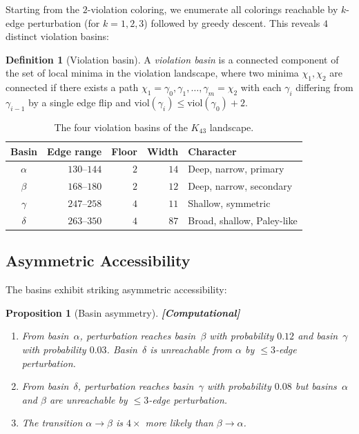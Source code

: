 \documentclass[12pt,a4paper]{article}
\newcommand{\computational}[1]{\textcolor{computational}{\textbf{[Computational]}} #1}
\newtheorem{proposition}[theorem]{Proposition}
\theoremstyle{definition}
\newtheorem{definition}[theorem]{Definition}
\theoremstyle{remark}
\newcommand{\Kn}[1]{K_{#1}}
\newcommand{\viol}{\mathrm{viol}}
\begin{document}
Starting from the $2$-violation coloring, we enumerate all colorings reachable by $k$-edge perturbation (for $k = 1, 2, 3$) followed by greedy descent.  This reveals $4$ distinct violation basins:

\begin{definition}[Violation basin]\label{def:violbasin}
A \emph{violation basin} is a connected component of the set of local minima in the violation landscape, where two minima $\chi_1, \chi_2$ are connected if there exists a path $\chi_1 = \gamma_0, \gamma_1, \ldots, \gamma_m = \chi_2$ with each $\gamma_i$ differing from $\gamma_{i-1}$ by a single edge flip and $\viol(\gamma_i) \le \viol(\gamma_0) + 2$.
\end{definition}

\begin{table}[H]
\centering
\caption{The four violation basins of the $\Kn{43}$ landscape.}\label{tab:basins}
\begin{tabular}{@{}crrrl@{}}
\toprule
\textbf{Basin} & \textbf{Edge range} & \textbf{Floor} & \textbf{Width} & \textbf{Character} \\
\midrule
$\alpha$ & $130$--$144$ & $2$ & $14$ & Deep, narrow, primary \\
$\beta$ & $168$--$180$ & $2$ & $12$ & Deep, narrow, secondary \\
$\gamma$ & $247$--$258$ & $4$ & $11$ & Shallow, symmetric \\
$\delta$ & $263$--$350$ & $4$ & $87$ & Broad, shallow, Paley-like \\
\bottomrule
\end{tabular}
\end{table}

\subsection{Asymmetric Accessibility}

The basins exhibit striking asymmetric accessibility:

\begin{proposition}[Basin asymmetry]\label{prop:basinasym}
\computational{%
\begin{enumerate}[nosep, label=(\alph*)]
    \item From basin~$\alpha$, perturbation reaches basin~$\beta$ with probability $0.12$ and basin~$\gamma$ with probability $0.03$.  Basin~$\delta$ is unreachable from $\alpha$ by $\le 3$-edge perturbation.
    \item From basin~$\delta$, perturbation reaches basin~$\gamma$ with probability $0.08$ but basins~$\alpha$ and $\beta$ are unreachable by $\le 3$-edge perturbation.
    \item The transition $\alpha \to \beta$ is $4\times$ more likely than $\beta \to \alpha$.
\end{enumerate}}
\end{proposition}
\end{document}
